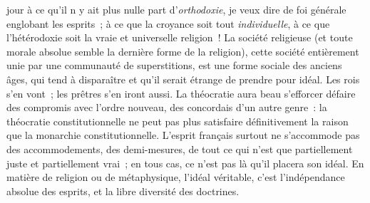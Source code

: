 \documentclass[french,twoside]{book} %
\begin{document}
jour à ce qu’il n y ait plus nulle part d’\emph{orthodoxie}, je veux dire de foi générale englobant les esprits ; à ce que la croyance soit tout \emph{individuelle}, à ce que l’hétérodoxie soit la vraie et universelle religion ! La société religieuse (et toute morale absolue semble la dernière forme de la religion), cette société entièrement unie par une communauté de superstitions, est une forme sociale des anciens âges, qui tend à disparaître et qu’il serait étrange de prendre pour idéal. Les rois s’en vont ; les prêtres s’en iront aussi. La théocratie aura beau s’efforcer défaire des compromis avec l’ordre nouveau, des concordais d’un autre genre : la théocratie constitutionnelle ne peut pas plus satisfaire définitivement la raison que la monarchie constitutionnelle. L’esprit français surtout ne s’accommode pas des accommodements, des demi-mesures, de tout ce qui n’est que partiellement juste et partiellement vrai ; en tous cas, ce n’est pas là qu’il placera son idéal. En matière de religion ou de métaphysique, l’idéal véritable, c’est l’indépendance absolue des esprits, et la libre diversité des doctrines.\par
\end{document}

